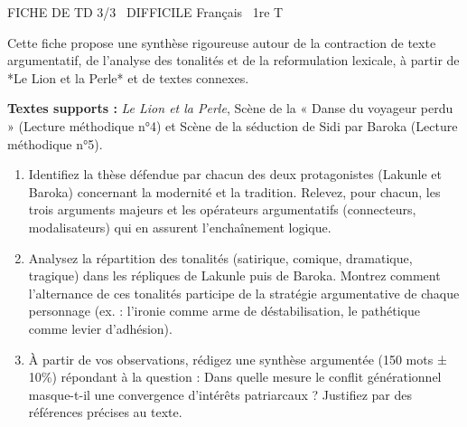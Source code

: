 \documentclass[11pt]{article}
\begin{document}
\begin{tcolorbox}[enhanced,colback=popink,colframe=popink,arc=10pt,boxrule=0pt,left=12pt,right=12pt,top=9pt,bottom=9pt]
{\color{white}\popxbold\small FICHE DE TD 3/3 \textbullet\ DIFFICILE \hfill Français \textbullet\ 1re T\par}
\end{tcolorbox}
\vspace{4pt}
Cette fiche propose une synthèse rigoureuse autour de la contraction de texte argumentatif, de l'analyse des tonalités et de la reformulation lexicale, à partir de *Le Lion et la Perle* et de textes connexes.

\begin{exercice}
\textbf{Textes supports :} \textit{Le Lion et la Perle}, Scène de la « Danse du voyageur perdu » (Lecture méthodique n°4) et Scène de la séduction de Sidi par Baroka (Lecture méthodique n°5).
\begin{enumerate}
    \item Identifiez la thèse défendue par chacun des deux protagonistes (Lakunle et Baroka) concernant la modernité et la tradition. Relevez, pour chacun, les trois arguments majeurs et les opérateurs argumentatifs (connecteurs, modalisateurs) qui en assurent l'enchaînement logique.
    \item Analysez la répartition des tonalités (satirique, comique, dramatique, tragique) dans les répliques de Lakunle puis de Baroka. Montrez comment l'alternance de ces tonalités participe de la stratégie argumentative de chaque personnage (ex. : l'ironie comme arme de déstabilisation, le pathétique comme levier d'adhésion).
    \item À partir de vos observations, rédigez une synthèse argumentée (150 mots ± 10\%) répondant à la question : \og Dans quelle mesure le conflit générationnel masque-t-il une convergence d'intérêts patriarcaux ? \fg Justifiez par des références précises au texte.
\end{enumerate}
\end{exercice}
\end{document}
